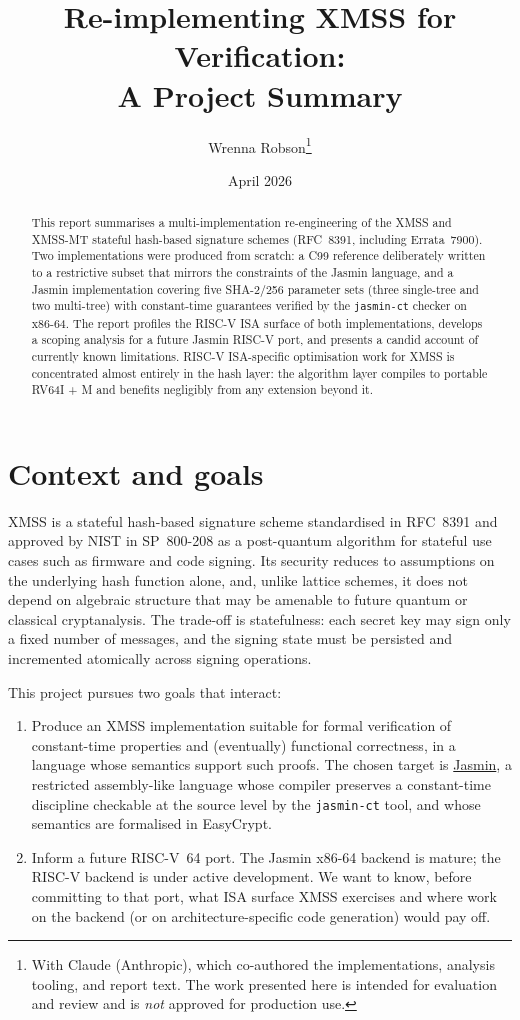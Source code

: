 \documentclass[11pt,a4paper]{article}
\title{Re-implementing XMSS for Verification:\\
  A Project Summary}
\author{Wrenna Robson\thanks{With Claude (Anthropic), which co-authored
  the implementations, analysis tooling, and report text. The work
  presented here is intended for evaluation and review and is
  \emph{not} approved for production use.}}
\date{April 2026}
\begin{document}
\maketitle

\begin{abstract}
This report summarises a multi-implementation re-engineering of the
XMSS and XMSS-MT stateful hash-based signature schemes (RFC~8391,
including Errata~7900). Two implementations were produced from
scratch: a C99 reference deliberately written to a restrictive
subset that mirrors the constraints of the Jasmin language, and a
Jasmin implementation covering five SHA-2/256 parameter sets (three
single-tree and two multi-tree) with constant-time guarantees
verified by the \texttt{jasmin-ct} checker on x86-64. The report
profiles the RISC-V ISA surface of both implementations, develops a
scoping analysis for a future Jasmin RISC-V port, and presents a
candid account of currently known limitations. RISC-V ISA-specific
optimisation work for XMSS is concentrated almost entirely in the
hash layer: the algorithm layer compiles to portable RV64I + M and
benefits negligibly from any extension beyond it.
\end{abstract}

\section{Context and goals}

XMSS is a stateful hash-based signature scheme standardised in
RFC~8391 and approved by NIST in SP~800-208 as a post-quantum
algorithm for stateful use cases such as firmware and code signing.
Its security reduces to assumptions on the underlying hash function
alone, and, unlike lattice schemes, it does not depend on
algebraic structure that may be amenable to future quantum or
classical cryptanalysis. The trade-off is statefulness: each secret
key may sign only a fixed number of messages, and the signing state
must be persisted and incremented atomically across signing
operations.

This project pursues two goals that interact:

\begin{enumerate}[nosep]
  \item Produce an XMSS implementation suitable for formal
    verification of constant-time properties and (eventually)
    functional correctness, in a language whose semantics support
    such proofs. The chosen target is
    \href{https://github.com/jasmin-lang/jasmin}{Jasmin}, a
    restricted assembly-like language whose compiler preserves a
    constant-time discipline checkable at the source level by the
    \texttt{jasmin-ct} tool, and whose semantics are formalised in
    EasyCrypt.
  \item Inform a future RISC-V~64 port. The Jasmin x86-64 backend
    is mature; the RISC-V backend is under active development. We
    want to know, before committing to that port, what ISA surface
    XMSS exercises and where work on the backend (or on
    architecture-specific code generation) would pay off.
\end{enumerate}
\end{document}
